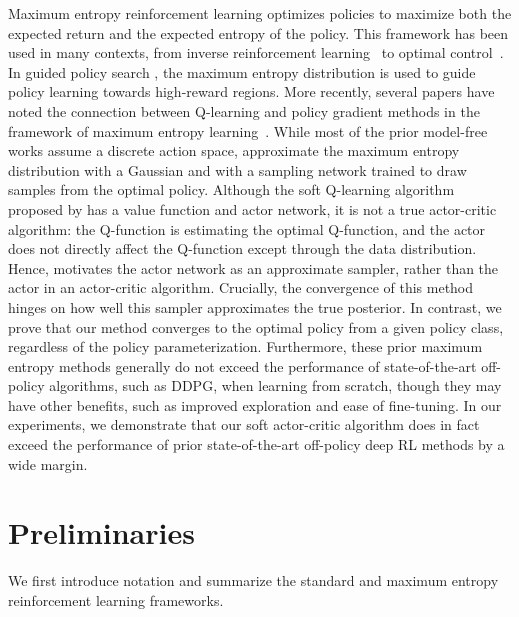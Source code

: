 \documentclass{article}
\begin{document}
Maximum entropy reinforcement learning optimizes policies to maximize both the expected return and the expected entropy of the policy. This framework has been used in many contexts, from inverse reinforcement learning~\citep{ziebart2008maximum} to optimal control~\citep{todorov2008general,toussaint2009robot,rawlik2012stochastic}. In guided policy search \citep{levine2013guided,levine2016end}, the maximum entropy distribution is used to guide policy learning towards high-reward regions. More recently, several papers have noted the connection between Q-learning and policy gradient methods in the framework of maximum entropy learning~\citep{o2016pgq,haarnoja2017reinforcement,nachum2017bridging,schulman2017equivalence}. While most of the prior model-free works assume a discrete action space, \citet{nachum2017trust} approximate the maximum entropy distribution with a Gaussian and \citet{haarnoja2017reinforcement} with a sampling network trained to draw samples from the optimal policy. Although the soft Q-learning algorithm proposed by \citet{haarnoja2017reinforcement} has a value function and actor network, it is not a true actor-critic algorithm: the Q-function is estimating the optimal Q-function, and the actor does not directly affect the Q-function except through the data distribution. Hence, \citet{haarnoja2017reinforcement} motivates the actor network as an approximate sampler, rather than the actor in an actor-critic algorithm. Crucially, the convergence of this method hinges on how well this sampler approximates the true posterior. In contrast, we prove that our method converges to the optimal policy from a given policy class, regardless of the policy parameterization. Furthermore, these prior maximum entropy methods generally do not exceed the performance of state-of-the-art off-policy algorithms, such as DDPG, when learning from scratch, though they may have other benefits, such as improved exploration and ease of fine-tuning. In our experiments, we demonstrate that our soft actor-critic algorithm does in fact exceed the performance of prior state-of-the-art off-policy deep RL methods by a wide margin.

\vspace{-1mm}
\section{Preliminaries}
\label{sec:preliminaries}

We first introduce notation and summarize the standard and maximum entropy reinforcement learning frameworks.
\end{document}
